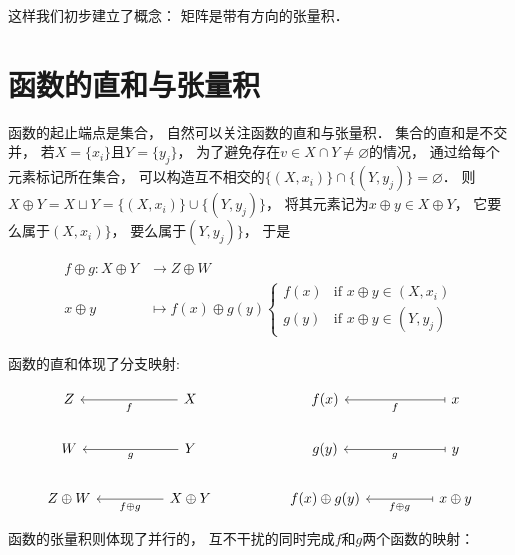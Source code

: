 \documentclass[10pt, openany]{book}
\begin{document}
这样我们初步建立了概念：
矩阵是带有方向的张量积．

\section{函数的直和与张量积}

函数的起止端点是集合，
自然可以关注函数的直和与张量积．
集合的直和是不交并，
若$X = \{x_i\}$且$Y = \{y_j\}$，
为了避免存在$v\in X \cap Y \neq \varnothing$的情况，
通过给每个元素标记所在集合，
可以构造互不相交的$\{ (X,x_i)\} \cap \{ (Y,y_j) \} = \varnothing$．
则$X \oplus Y = X \sqcup Y = \{ (X,x_i)\} \cup \{ (Y,y_j)\}$，
将其元素记为$x \oplus y \in X \oplus Y$，
它要么属于$(X,x_i)\}$，
要么属于$(Y,y_j)\}$，
于是

$$
\begin{aligned}
f \oplus g : X \oplus Y &\to Z \oplus W \\
x \oplus y &\mapsto f(x) \oplus g(y)
\begin{cases} 
f(x) & \text{if } x \oplus y \in (X,x_i) \\
g(y) & \text{if } x \oplus y \in (Y,y_j) 
\end{cases}
\end{aligned}
$$

函数的直和体现了分支映射:

$$
\begin{tikzcd}
Z          &  & X \arrow[ll, "f"]                   &  & f(x)             &  & x \arrow[ll, "f", maps to]                   \\
W          &  & Y \arrow[ll, "g"]                   &  & g(y)             &  & y \arrow[ll, "g", maps to]                   \\
Z \oplus W &  & X \oplus Y \arrow[ll, "f \oplus g"] &  & f(x) \oplus g(y) &  & x \oplus y \arrow[ll, "f \oplus g", maps to]
\end{tikzcd}
$$


函数的张量积则体现了并行的，
互不干扰的同时完成$f$和$g$两个函数的映射：
\end{document}
